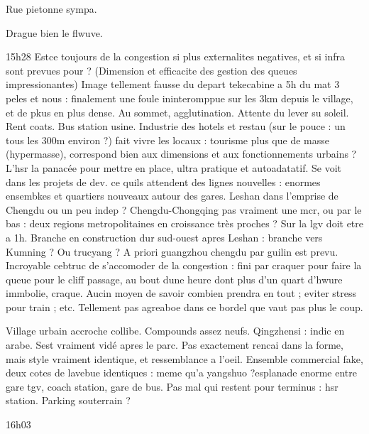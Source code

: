 Rue pietonne sympa.

Drague bien le flwuve.

15h28
Estce toujours de la congestion si plus externalites negatives, et si infra sont prevues pour ? (Dimension et efficacite des gestion des queues impressionantes)
Image tellement fausse du depart tekecabine a 5h du mat 3 peles et nous : finalement une foule ininteromppue sur les 3km depuis le village, et de pkus en plus dense. Au sommet, agglutination. Attente du lever su soleil. Rent coats. Bus station usine. Industrie des hotels et restau (sur le pouce : un tous les 300m environ ?) fait vivre les locaux : tourisme plus que de masse (hypermasse), correspond bien aux dimensions et aux fonctionnements urbains ? L'hsr la panacée pour mettre en place, ultra pratique et autoadatatif. Se voit dans les projets de dev. ce quils attendent des lignes nouvelles : enormes ensembkes et quartiers nouveaux autour des gares. Leshan dans l'emprise de Chengdu ou un peu indep ? Chengdu-Chongqing pas vraiment une mcr, ou par le bas : deux regions metropolitaines en croissance très proches ? Sur la lgv doit etre a 1h. Branche en construction dur sud-ouest apres Leshan : branche vers Kumning ? Ou trucyang ? A priori guangzhou chengdu par guilin est prevu.
Incroyable cebtruc de s'accomoder de la congestion : fini par craquer pour faire la queue pour le cliff passage, au bout dune heure dont plus d'un quart d'hwure immbolie, craque. Aucin moyen de savoir combien prendra en tout ; eviter stress pour train ; etc. Tellement pas agreaboe dans ce bordel que vaut pas plus le coup.

Village urbain accroche collibe.
Compounds assez neufs.
Qingzhensi : indic en arabe.
Sest vraiment vidé apres le parc.
Pas exactement rencai dans la forme, mais style vraiment identique, et ressemblance a l'oeil.
Ensemble commercial fake, deux cotes de lavebue identiques : meme qu'a yangshuo ?esplanade enorme entre gare tgv, coach station, gare de bus.
Pas mal qui restent pour terminus : hsr station.
Parking souterrain ?

16h03

